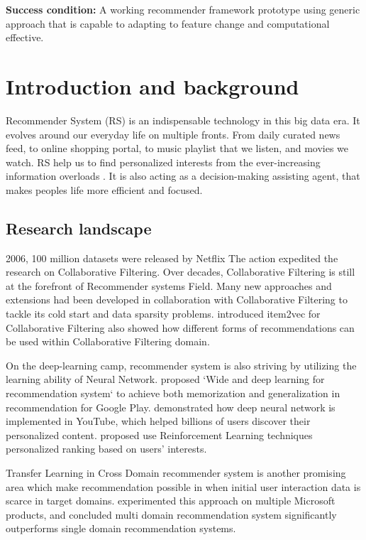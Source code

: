 \documentclass[12pt,a4 paper,title page]{article}
\theoremstyle{definition}
\begin{document}
\textbf{Success condition:} A working recommender framework prototype using generic approach that is capable to  adapting to feature change and computational effective.  

\newpage

\section{Introduction and background}
Recommender System (RS) is an indispensable technology in this big data era. It evolves around our everyday life on multiple fronts. From daily curated news feed, to online shopping portal, to music playlist that we listen, and movies we watch. RS help us to find personalized interests from the ever-increasing information overloads \citep{Lu2015}. It is also acting as a decision-making assisting agent, that makes peoples life more efficient and focused. 

\subsection{Research landscape}

2006, 100 million datasets were released by Netflix \citep{Bennett2007} The action expedited the research on Collaborative Filtering. Over decades, Collaborative Filtering is still at the forefront of Recommender systems Field. Many new approaches and extensions had been developed in collaboration with Collaborative Filtering to tackle its cold start and data sparsity problems. \citet{barkan2016item2vec} introduced item2vec for Collaborative Filtering also showed how different forms of recommendations can be used within Collaborative Filtering domain. 

On the deep-learning camp, recommender system is also striving by utilizing the learning ability of Neural Network. \citet{Cheng2016} proposed `Wide and deep learning for recommendation system` to achieve both memorization and generalization in recommendation for Google Play. \citet{Covington2016} demonstrated how deep neural network is implemented in YouTube, which helped billions of users discover their personalized content. \citet{Karatzoglou2013} proposed use Reinforcement Learning techniques personalized ranking based on users’ interests.  

Transfer Learning \citep{Pan2010} in Cross Domain recommender system is another promising area which make recommendation possible in when initial user interaction data is scarce in target domains. \citet{Elkahky2015} experimented this approach on multiple Microsoft products, and concluded multi domain recommendation system significantly outperforms single domain recommendation systems. 
\end{document}

